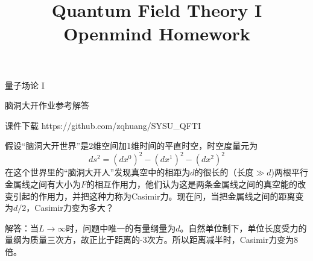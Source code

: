 \documentclass[CJK]{beamer}
\title{Quantum Field Theory I \\ Openmind Homework}
\author{}
\date{}
\begin{document}
\begin{frame}
 
\begin{center}
\begin{Large}
\bch
量子场论 I 

{\vskip 0.3in}

脑洞大开作业参考解答

\ech
\end{Large}
\end{center}

\vskip 0.2in

\bch
课件下载
\ech
https://github.com/zqhuang/SYSU\_QFTI

\end{frame}


\begin{frame}
\bch
\small{假设“脑洞大开世界”是2维空间加1维时间的平直时空，时空度量元为
$$ds^2 = (dx^0)^2 - (dx^1)^2-(dx^2)^2$$
在这个世界里的“脑洞大开人”发现真空中的相距为$d$的很长的（长度$\gg d$)两根平行金属线之间有大小为$F$的相互作用力，他们认为这是两条金属线之间的真空能的改变引起的作用力，并把这种力称为Casimir力。现在问，当把金属线之间的距离变为$d/2$，Casimir力变为多大？}

\skipline

解答：当$L\rightarrow \infty$时，问题中唯一的有量纲量为$d$。自然单位制下，单位长度受力的量纲为质量三次方，故正比于距离的-3次方。所以距离减半时，Casimir力变为8倍。

\ech
\end{frame}
\end{document}
